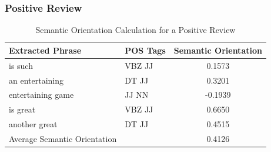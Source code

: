 \documentclass[11pt]{report} %
\begin{document}
\subsubsection{Positive Review}

\begin{table}[h!]
	\centering
    \begin{tabular}{  l  l  c}
    \hline\hline
    	 Extracted Phrase & POS Tags & Semantic Orientation \\ \hline
	is such & VBZ JJ & 0.1573 \\ \hline
	an entertaining & DT JJ & 0.3201 \\ \hline
	entertaining game & JJ NN & -0.1939 \\ \hline \hline
	is great & VBZ JJ & 0.6650 \\ \hline \hline
	another great & DT JJ & 0.4515 \\ \hline \hline
	Average Semantic Orientation & & 0.4126\\ \hline
    \hline
    \end{tabular}
\caption{Semantic Orientation Calculation for a Positive Review}
\label{fig:positive_review}
\end{table}
\end{document}
